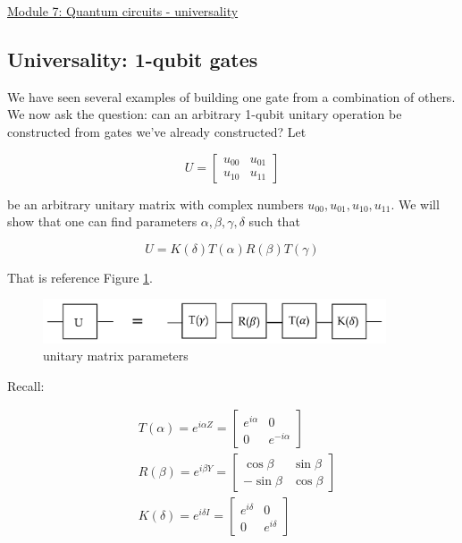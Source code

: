 \documentclass[main.tex]{subfiles}
\begin{document}
\href{https://www2.seas.gwu.edu/~simhaweb/quantum/modules/module7/module7.html}{Module 7: Quantum circuits - universality}

\subsection{Universality: 1-qubit gates}

    We have seen several examples of building one gate from a combination of others. We now ask the question: can an arbitrary 1-qubit unitary operation be constructed from gates we've already constructed? Let
    
    $$
    U=\left[\begin{array}{ll}
    u_{00} & u_{01} \\
    u_{10} & u_{11}
    \end{array}\right]
    $$
    
    be an arbitrary unitary matrix with complex numbers $u_{00}, u_{01}, u_{10}, u_{11}$. We will show that one can find parameters $\alpha, \beta, \gamma, \delta$ such that
    
    $$
    U=K(\delta) T(\alpha) R(\beta) T(\gamma)
    $$
    
    That is reference Figure \ref{fig:01universal1}.
    
    \begin{figure}
        \centering
        \includegraphics[width=4in]{notes/figs/n09/01universal1.png}
        \caption{unitary matrix parameters}
        \label{fig:01universal1}
    \end{figure}
    
    Recall:
    
    $$
    \begin{aligned}
    &T(\alpha)=e^{i \alpha Z}=\left[\begin{array}{cc}
    e^{i \alpha} & 0 \\
    0 & e^{-i \alpha}
    \end{array}\right] \\
    &R(\beta)=e^{i \beta Y}=\left[\begin{array}{cc}
    \cos \beta & \sin \beta \\
    -\sin \beta & \cos \beta
    \end{array}\right] \\
    &K(\delta)=e^{i \delta I}=\left[\begin{array}{cc}
    e^{i \delta} & 0 \\
    0 & e^{i \delta}
    \end{array}\right]
    \end{aligned}
    $$
    
\end{document}
